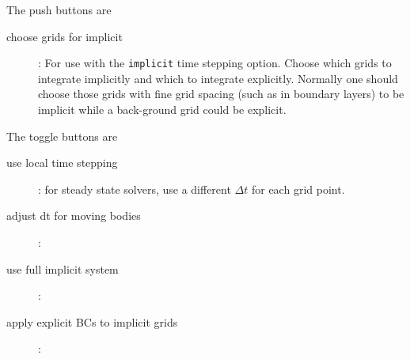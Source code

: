 \noindent The push buttons are
\begin{description}
  \item[\qquad choose grids for implicit] : For use with the {\tt implicit} time stepping option. Choose 
         which grids to integrate implicitly and which to integrate explicitly. Normally one should choose
         those grids with fine grid spacing (such as in boundary layers) to be implicit while a back-ground
       grid could be explicit. 
\end{description}

\noindent The toggle buttons are 
 \begin{description}
  \item[\qquad use local time stepping] : for steady state solvers, use a different $\Delta t$ for each grid point.
  \item[\qquad adjust dt for moving bodies] :
  \item[\qquad use full implicit system] :
  \item[\qquad apply explicit BCs to implicit grids] : 
\end{description}

